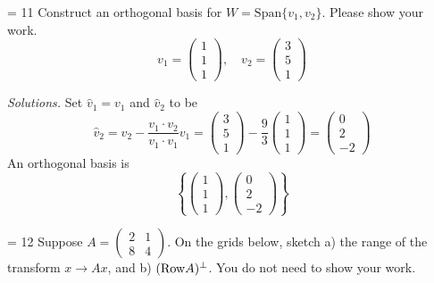    \else
    \vspace{-12pt}
    \begin{center}
    \qquad
    \end{center}   
   \fi
\fi



\ifnum \Version = 11
\question[2] Construct an orthogonal basis for $W = \text{Span}\{v_1,v_2\}$. Please show your work. 
$$v_1 = \begin{pmatrix} 1\\1\\1\end{pmatrix}, \quad v_2 = \begin{pmatrix} 3\\5\\1\end{pmatrix}$$

\ifnum {} {\color{DarkBlue} \textit{Solutions.} Set $\hat v_1 = v_1$ and $\hat v_2$ to be
$$\hat v_2 = v_2 - \frac{v_1\cdot v_2}{v_1\cdot v_1} v_1 = \begin{pmatrix} 3\\5\\1\end{pmatrix} - \frac{9}{3}\begin{pmatrix} 1\\1\\1\end{pmatrix} = \begin{pmatrix} 0\\2\\-2\end{pmatrix}$$ An orthogonal basis is $$\left\{ \begin{pmatrix}1\\1\\1 \end{pmatrix}, \begin{pmatrix} 0\\2\\-2\end{pmatrix}\right\}$$
}
\fi
\fi


\ifnum \Version = 12
\question[2] Suppose $A = \begin{pmatrix} 2&1\\8&4 \end{pmatrix}$. On the grids below, sketch a) the range of the transform $x \to Ax$, and b) $(\text{Row} A)^{\perp}$. You do not need to show your work. 

